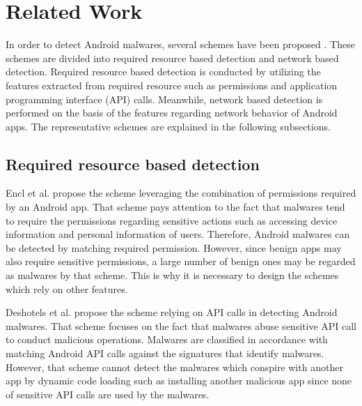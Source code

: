 \chapter{Related Work}\label{sec:related_work} 
In order to detect Android malwares, several schemes have been proposed . 
These schemes are divided into required resource based detection and network based detection.
Required resource based detection is conducted by utilizing the features extracted from required resource such as permissions and application programming interface (API) calls.
Meanwhile, network based detection is performed on the basis of the features regarding network behavior of Android apps.
The representative schemes are explained in the following subsections.

\section{Required resource based detection}
Encl et al. \cite{enck2009lightweight} propose the scheme leveraging the combination of permissions required by an Android app. 
That scheme pays attention to the fact that malwares tend to require the permissions regarding sensitive actions such as accessing device information and personal information of users.
Therefore, Android malwares can be detected by matching required permission.
However, since benign apps may also require sensitive permissions, a large number of benign ones may be regarded as malwares by that scheme.
This is why it is necessary to design the schemes which rely on other features.

Deshotels et al. \cite{deshotels2014droidlegacy} propose the scheme relying on API calls in detecting Android malwares. 
That scheme focuses on the fact that malwares abuse sensitive API call to conduct malicious operations.
Malwares are classified in accordance with matching Android API calls against the signatures that identify malwares.  
However, that scheme cannot detect the malwares which conspire with another app by dynamic code loading such as installing another malicious app since none of sensitive API calls are used by the malwares. 


